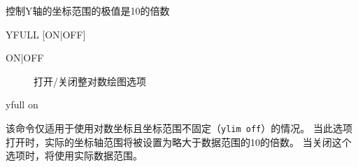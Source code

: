 \label{cmd:yfull}

控制Y轴的坐标范围的极值是10的倍数

\begin{SACSTX}
YFULL [ON|OFF]
\end{SACSTX}

\begin{description}
\item [ON|OFF] 打开/关闭整对数绘图选项
\end{description}

\begin{SACDFT}
yfull on
\end{SACDFT}

该命令仅适用于使用对数坐标且坐标范围不固定（\texttt{ylim off}）的情况。
当此选项打开时，实际的坐标轴范围将被设置为略大于数据范围的10的倍数。
当关闭这个选项时，将使用实际数据范围。
